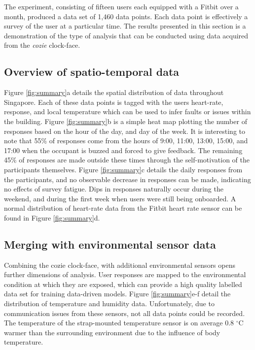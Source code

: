 
The experiment, consisting of fifteen users each equipped with a Fitbit over a month, produced a data set of 1,460 data points. Each data point is effectively a survey of the user at a particular time. The results presented in this section is a demonstration of the type of analysis that can be conducted using data acquired from the \emph{cozie} clock-face.

\subsection{Overview of spatio-temporal data}
Figure \ref{fig:summary}a details the spatial distribution of data throughout Singapore. Each of these data points is tagged with the users heart-rate, response, and local temperature which can be used to infer faults or issues within the building. Figure \ref{fig:summary}b is a simple heat map plotting the number of responses based on the hour of the day, and day of the week. It is interesting to note that 55\% of responses come from the hours of 9:00, 11:00, 13:00, 15:00, and 17:00 when the occupant is buzzed and forced to give feedback. The remaining 45\% of responses are made outside these times through the self-motivation of the participants themselves. Figure \ref{fig:summary}c details the daily responses from the participants, and no observable decrease in responses can be made, indicating no effects of survey fatigue. Dips in responses naturally occur during the weekend, and during the first week when users were still being onboarded. A normal distribution of heart-rate data from the Fitbit heart rate sensor can be found in Figure \ref{fig:summary}d.

\subsection{Merging with environmental sensor data}
Combining the cozie clock-face, with additional environmental sensors opens further dimensions of analysis. User responses are mapped to the environmental condition at which they are exposed, which can provide a high quality labelled data set for training data-driven models. Figure \ref{fig:summary}e-f detail the distribution of temperature and humidity data. Unfortunately, due to communication issues from these sensors, not all data points could be recorded. The temperature of the strap-mounted temperature sensor is on average 0.8 $^\circ$C warmer than the surrounding environment due to the influence of body temperature. 

